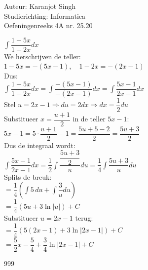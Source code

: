 \documentclass[a4paper]{article}
\begin{document}
  
\noindent \large Auteur: Karanjot Singh \\
\noindent \large Studierichting: Informatica \\
\noindent \large Oefeningenreeks 4A nr. 25.20 \\

\normalsize

\noindent $\displaystyle\int \dfrac{1 - 5x}{1 - 2x} dx$ \\

We herschrijven de teller: \\

$1 - 5x = - (5x - 1), \quad 1 - 2x = - (2x - 1)$ \\

Dus: \\

$\displaystyle\int \dfrac{1 - 5x}{1 - 2x} dx = \displaystyle\int \dfrac{-(5x - 1)}{-(2x - 1)} dx = \displaystyle\int \dfrac{5x - 1}{2x - 1} dx$ \\

Stel $u = 2x - 1 \Rightarrow du = 2dx \Rightarrow dx = \dfrac{1}{2} du$ \\

Substitueer $x = \dfrac{u + 1}{2}$ in de teller $5x - 1$: \\

$5x - 1 = 5 \cdot \dfrac{u + 1}{2} - 1 = \dfrac{5u + 5 - 2}{2} = \dfrac{5u + 3}{2}$ \\

Dus de integraal wordt: \\

$\displaystyle\int \dfrac{5x - 1}{2x - 1} dx = \dfrac{1}{2} \displaystyle\int \dfrac{\dfrac{5u + 3}{2}}{u} du = \dfrac{1}{4} \displaystyle\int \dfrac{5u + 3}{u} du$ \\

Splits de breuk: \\

$= \dfrac{1}{4} \left( \displaystyle\int 5 \, du + \displaystyle\int \dfrac{3}{u} du \right)$ \\

$= \dfrac{1}{4} \left( 5u + 3 \ln |u| \right) + C$ \\

Substitueer $u = 2x - 1$ terug: \\

$= \dfrac{1}{4} \left( 5(2x - 1) + 3 \ln |2x - 1| \right) + C$ \\

$= \dfrac{5}{2} x - \dfrac{5}{4} + \dfrac{3}{4} \ln |2x - 1| + C$ \\

\begin{thebibliography}{999}
\end{thebibliography}
\end{document}
